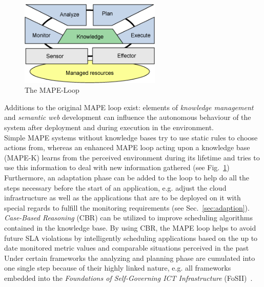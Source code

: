\documentclass[a4paper]{llncs}
\begin{document}
\begin{figure}[Ht]
	\centering
		\includegraphics[width=0.6\textwidth]{figs/mape.png}
	\caption{The MAPE-Loop}
	\label{fig:mape}
\end{figure}

Additions to the original MAPE loop exist: elements of \textit{knowledge management} and \textit{semantic web} development can influence the autonomous behaviour of the system after deployment and during execution in the environment.\\
Simple MAPE systems without knowledge bases try to use static rules to choose actions from, whereas an enhanced MAPE loop acting upon a knowledge base (MAPE-K) learns from the perceived environment during its lifetime and tries to use this information to deal with new information gathered (see Fig.~\ref{fig:mape})\\
Furthermore, an adaptation phase can be added to the loop to help do all the steps necessary before the start of an application, e.g. adjust the cloud infrastructure as well as the applications that are to be deployed on it with special regards to fulfill the monitoring requirements (see Sec.~\ref{sec:adaption})\cite{Maurer11}.\\
\textit{Case-Based Reasoning} (CBR) can be utilized to improve scheduling algorithms contained in the knowledge base. By using CBR, the MAPE loop helps to avoid future SLA violations by intelligently scheduling applications based on the up to date monitored metric values and comparable situations perceived in the past~\cite{Maurer10}\cite{Maurer11}\\
Under certain frameworks the analyzing and planning phase are cumulated into one single step  because of their highly linked nature, e.g. all frameworks embedded into the \textit{Foundations of Self-Governing ICT Infrastructure} (FoSII)~\cite{Maurer11}\cite{Emeakaroha10a}\cite{Emeakaroha10b}.
\end{document}
